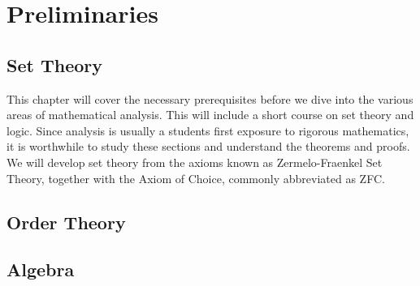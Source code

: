\part{Preliminaries}
    \chapter{Set Theory}
        This chapter will cover the necessary prerequisites before we dive into
        the various areas of mathematical analysis. This will include a short
        course on set theory and logic. Since analysis is usually a students
        first exposure to rigorous mathematics, it is worthwhile to study these
        sections and understand the theorems and proofs. We will develop set
        theory from the axioms known as Zermelo-Fraenkel Set Theory,
        together with the Axiom of Choice, commonly abbreviated as ZFC.
        
        
        
        
    \chapter{Order Theory}
        
    \chapter{Algebra}
        
